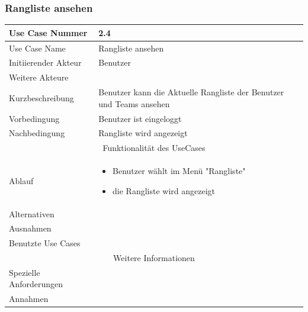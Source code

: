 \documentclass[10pt,a4paper]{article}
\begin{document}
\subsubsection{Rangliste ansehen}
		\begin{tabular}{|l|p{.5\linewidth}|}
		\hline Use Case Nummer & 2.4 \\ 
		\hline Use Case Name & Rangliste ansehen\\ 
		\hline Initiierender Akteur & Benutzer \\
		\hline Weitere Akteure &  \\
		\hline Kurzbeschreibung & Benutzer kann die Aktuelle Rangliste der Benutzer und Teams ansehen \\
		\hline Vorbedingung & Benutzer ist eingeloggt \\
		\hline Nachbedingung & Rangliste wird angezeigt \\
		\hline \multicolumn{2}{|c|}{Funktionalität des UseCases}\\
		\hline Ablauf & \begin{itemize}
			\item Benutzer w\"ahlt im Menü "Rangliste"
			\item die Rangliste wird angezeigt
		\end{itemize} \\
		\hline Alternativen &  \\
		\hline Ausnahmen &  \\
		\hline Benutzte Use Cases &  \\
		\hline \multicolumn{2}{|c|}{Weitere Informationen} \\
		\hline Spezielle Anforderungen &  \\
		\hline Annahmen &  \\
		\hline
		\end{tabular}
\end{document}
